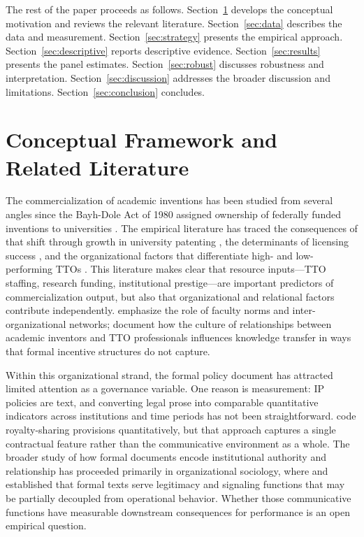 \documentclass[12pt]{article}
\begin{document}
The rest of the paper proceeds as follows. Section~\ref{sec:framework} develops the
conceptual motivation and reviews the relevant literature. Section~\ref{sec:data}
describes the data and measurement. Section~\ref{sec:strategy} presents the empirical
approach. Section~\ref{sec:descriptive} reports descriptive evidence. Section~\ref{sec:results}
presents the panel estimates. Section~\ref{sec:robust} discusses robustness and
interpretation. Section~\ref{sec:discussion} addresses the broader discussion and
limitations. Section~\ref{sec:conclusion} concludes.

\section{Conceptual Framework and Related Literature}
\label{sec:framework}

The commercialization of academic inventions has been studied from several angles since
the Bayh-Dole Act of 1980 assigned ownership of federally funded inventions to universities
\citep{mowery2001}. The empirical literature has traced the consequences of that shift through
growth in university patenting \citep{henderson1998, sampat2006}, the determinants of
licensing success \citep{jensenthursby2001, lachschankerman2008}, and the organizational
factors that differentiate high- and low-performing TTOs \citep{thursby2002, siegel2003,
siegel2004, dechenaux2011}. This literature makes clear that resource inputs---TTO staffing,
research funding, institutional prestige---are important predictors of commercialization
output, but also that organizational and relational factors contribute independently.
\citet{owensmithpowell2001} emphasize the role of faculty norms and inter-organizational
networks; \citet{siegel2004} document how the culture of relationships between academic
inventors and TTO professionals influences knowledge transfer in ways that formal
incentive structures do not capture.

Within this organizational strand, the formal policy document has attracted limited
attention as a governance variable. One reason is measurement: IP policies are text, and
converting legal prose into comparable quantitative indicators across institutions and
time periods has not been straightforward. \citet{lachschankerman2008} code royalty-sharing
provisions quantitatively, but that approach captures a single contractual feature rather
than the communicative environment as a whole. The broader study of how formal documents
encode institutional authority and relationship has proceeded primarily in organizational
sociology, where \citet{dimaggio1983} and \citet{meyer1977} established that formal
texts serve legitimacy and signaling functions that may be partially decoupled from
operational behavior. Whether those communicative functions have measurable downstream
consequences for performance is an open empirical question.
\end{document}
